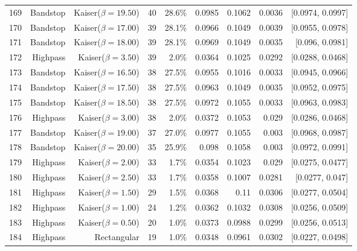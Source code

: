 \begin{longtable}{lrrrrrrrr}
    169 & Bandstop & Kaiser($\beta=19.50$) & 40 & 28.6\% & 0.0985 & 0.1062 & 0.0036 & [0.0974, 0.0997] \\
    170 & Bandstop & Kaiser($\beta=17.00$) & 39 & 28.1\% & 0.0966 & 0.1049 & 0.0039 & [0.0955, 0.0978] \\
    171 & Bandstop & Kaiser($\beta=18.00$) & 39 & 28.1\% & 0.0969 & 0.1049 & 0.0035 & [0.096, 0.0981] \\
    172 & Highpass & Kaiser($\beta=3.50$) & 39 & 2.0\% & 0.0364 & 0.1025 & 0.0292 & [0.0288, 0.0468] \\
    173 & Bandstop & Kaiser($\beta=16.50$) & 38 & 27.5\% & 0.0955 & 0.1016 & 0.0033 & [0.0945, 0.0966] \\
    174 & Bandstop & Kaiser($\beta=17.50$) & 38 & 27.5\% & 0.0963 & 0.1049 & 0.0035 & [0.0952, 0.0975] \\
    175 & Bandstop & Kaiser($\beta=18.50$) & 38 & 27.5\% & 0.0972 & 0.1055 & 0.0033 & [0.0963, 0.0983] \\
    176 & Highpass & Kaiser($\beta=3.00$) & 38 & 2.0\% & 0.0372 & 0.1053 & 0.029 & [0.0286, 0.0468] \\
    177 & Bandstop & Kaiser($\beta=19.00$) & 37 & 27.0\% & 0.0977 & 0.1055 & 0.003 & [0.0968, 0.0987] \\
    178 & Bandstop & Kaiser($\beta=20.00$) & 35 & 25.9\% & 0.098 & 0.1058 & 0.003 & [0.0972, 0.0991] \\
    179 & Highpass & Kaiser($\beta=2.00$) & 33 & 1.7\% & 0.0354 & 0.1023 & 0.029 & [0.0275, 0.0477] \\
    180 & Highpass & Kaiser($\beta=2.50$) & 33 & 1.7\% & 0.0358 & 0.1007 & 0.0281 & [0.0277, 0.047] \\
    181 & Highpass & Kaiser($\beta=1.50$) & 29 & 1.5\% & 0.0368 & 0.11 & 0.0306 & [0.0277, 0.0504] \\
    182 & Highpass & Kaiser($\beta=1.00$) & 24 & 1.2\% & 0.0362 & 0.1032 & 0.0308 & [0.0256, 0.0509] \\
    183 & Highpass & Kaiser($\beta=0.50$) & 20 & 1.0\% & 0.0373 & 0.0988 & 0.0299 & [0.0256, 0.0513] \\
    184 & Highpass & Rectangular & 19 & 1.0\% & 0.0348 & 0.0961 & 0.0302 & [0.0227, 0.0498] \\
    \bottomrule
  \end{longtable}

